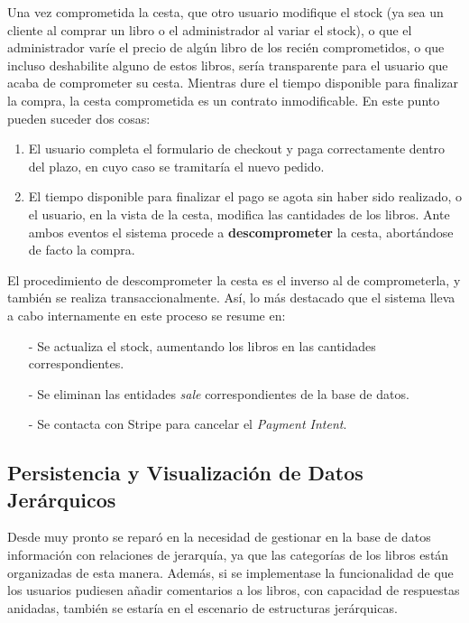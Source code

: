 \documentclass[a4paper]{article}
\begin{document}
    Una vez comprometida la cesta, que otro usuario modifique el stock (ya sea un cliente al comprar un libro o el administrador al variar el stock), o que el administrador varíe el precio de algún libro de los recién comprometidos, o que incluso deshabilite alguno de estos libros, sería transparente para el usuario que acaba de comprometer su cesta. Mientras dure el tiempo disponible para finalizar la compra, la cesta comprometida es un contrato inmodificable. En este punto pueden suceder dos cosas: 
    
    \begin{enumerate}
    	\item El usuario completa el formulario de checkout y paga correctamente dentro del plazo, en cuyo caso se tramitaría el nuevo pedido.
    	\item El tiempo disponible para finalizar el pago se agota sin haber sido realizado, o el usuario, en la vista de la cesta, modifica las cantidades de los libros. Ante ambos eventos el sistema procede a \textbf{descomprometer} la cesta, abortándose de facto la compra.
    \end{enumerate}
    
    El procedimiento de descomprometer la cesta es el inverso al de comprometerla, y también se realiza transaccionalmente. Así, lo más destacado que el sistema lleva a cabo internamente en este proceso se resume en:
    
    \begin{itemize}
    	\item[-] Se actualiza el stock, aumentando los libros en las cantidades correspondientes.
    	\item[-] Se eliminan las entidades \emph{sale} correspondientes de la base de datos.
    	\item[-] Se contacta con Stripe para cancelar el \emph{Payment Intent}.
    \end{itemize}

    \subsection{Persistencia y Visualización de Datos Jerárquicos}
    Desde muy pronto se reparó en la necesidad de gestionar en la base de datos información con relaciones de jerarquía, ya que las categorías de los libros están organizadas de esta manera. Además, si se implementase la funcionalidad de que los usuarios pudiesen añadir comentarios a los libros, con capacidad de respuestas anidadas, también se estaría en el escenario de estructuras jerárquicas.
    
\end{document}

